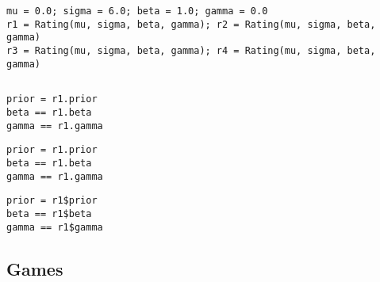 \documentclass[article]{jss}
\newif\ifen
\newif\ifes
\newcommand{\en}[1]{\ifen#1\fi}
\newcommand{\es}[1]{\ifes#1\fi}
\begin{document}
\en{The class \texttt{Rating()} is represented by: the mean (\texttt{mu}) and the deviation (\texttt{sigma}) of the prior Gaussian distribution; the performance standard deviation (\texttt{beta}); and the temporal volatility of the skills (\texttt{gamma}).}
\es{La clase \texttt{Rating()} se representa con cuatro atributos: la media (\texttt{mu}) y el desv\'io (\texttt{sigma}) de la distribuci\'on Gaussiana a priori; el dev\'io de los rendimientos (\texttt{beta}); y la volatilidad temporal de las habilidades (\texttt{gamma}).}
%
\begin{lstlisting}[backgroundcolor=\color{white},label=lst:rating, caption=\relax, belowskip=-1.0 \baselineskip, aboveskip=-0 \baselineskip]
\end{lstlisting}
\begin{lstlisting}[backgroundcolor=\color{all}]
mu = 0.0; sigma = 6.0; beta = 1.0; gamma = 0.0
r1 = Rating(mu, sigma, beta, gamma); r2 = Rating(mu, sigma, beta, gamma)
r3 = Rating(mu, sigma, beta, gamma); r4 = Rating(mu, sigma, beta, gamma)
\end{lstlisting}  
%
\en{For efficiency, the prior is stored pre-computed.}
\es{Por cuesti\'on de eficiencia, el prior Gaussiano se guarda precomputado.}
%
\begin{lstlisting}[backgroundcolor=\color{white},label=lst:prior, caption=\relax, belowskip=-1.0 \baselineskip, aboveskip=-0 \baselineskip]
\end{lstlisting}
\begin{paracol}{3}
\begin{lstlisting}[backgroundcolor=\color{julia}]
prior = r1.prior
beta == r1.beta
gamma == r1.gamma
\end{lstlisting}
\switchcolumn
\begin{lstlisting}[backgroundcolor=\color{python}]
prior = r1.prior
beta == r1.beta
gamma == r1.gamma
\end{lstlisting}
\switchcolumn
\begin{lstlisting}[backgroundcolor=\color{r}]
prior = r1$prior
beta == r1$beta
gamma == r1$gamma
\end{lstlisting}
\end{paracol}
%

\subsection{Games} \label{sec:game}
\end{document}
